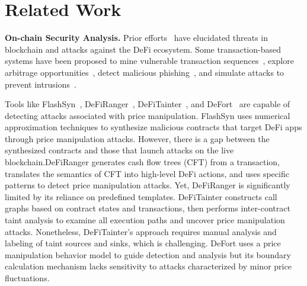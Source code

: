 \vspace{-0.5ex}
\section{Related Work}
\label{sec:related}

\noindent
\textbf{On-chain Security Analysis.}
Prior efforts~\cite{zhou2021high, qin2021attacking, qin2022quantifying, daian2020flash, zhou2023sok} have elucidated threats in blockchain and attacks against the DeFi ecosystem. Some transaction-based systems have been proposed to mine vulnerable transaction sequences~\cite{zhang2020txspector, so2021smartest}, explore arbitrage opportunities~\cite{zhou2021just}, detect malicious phishing~\cite{he2023txphishscope}, and simulate attacks to prevent intrusions~\cite{qin2023blockchain}.

Tools like FlashSyn~\cite{chen2024flashsyn}, DeFiRanger~\cite{DeFiRanger23}, DeFiTainter~\cite{DeFiTainter23}, and DeFort~\cite{DeFort24} are capable of detecting attacks associated with price manipulation. FlashSyn uses numerical approximation techniques to synthesize malicious contracts that target DeFi apps through price manipulation attacks. However, there is a gap between the synthesized contracts and those that launch attacks on the live blockchain.DeFiRanger generates cash flow trees (CFT) from a transaction, translates the semantics of CFT into high-level DeFi actions, and uses specific patterns to detect price manipulation attacks. Yet, DeFiRanger is significantly limited by its reliance on predefined templates. DeFiTainter constructs call graphs based on contract states and transactions, then performs inter-contract taint analysis to examine all execution paths and uncover price manipulation attacks. Nonetheless, DeFiTainter's approach requires manual analysis and labeling of taint sources and sinks, which is challenging. DeFort uses a price manipulation behavior model to guide detection and analysis but its boundary calculation mechanism lacks sensitivity to attacks characterized by minor price fluctuations.

